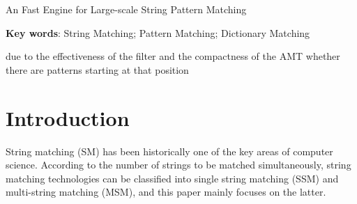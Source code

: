 \documentclass{article}
\begin{document}



\begin{center}
{\Large An Fast Engine for Large-scale String Pattern Matching}
\end{center}


\begin{abstract} 
  Multi-string matching is the core technique that is widely used in
  many applications. In general, it searches a text string for all
  occurrences of some string patterns. However, as the number of
  string patterns increases, most of the existing algorithms suffer
  from two issues: the long matching time, and the high memory
  consumption. To address these issues, in this paper, a fast matching
  engine is proposed for large-scale string matching problems. Our
  engine includes a filter module and a verification module. The filter
  module is based on several bitmaps, which is response for quickly
  filtering out the invalid positions in the text, while for each
  potential matched position, the verification module confirms true
  pattern occurrence. In particular, we design a compact data
  structure called Adaptive Matching Tree (AMT) as the verification
  module, in which each tree node saves some pattern fragments of the
  whole pattern set. The key point is that, the inner structure of
  each tree node is chosen adaptively according to the features of the
  corresponding pattern fragments, and this makes the whole AMT both
  time and space efficient for verifying. The experiments indicate
  that, our matching engine performs better than the prior algorithms,
  especially for large pattern sets.
\end{abstract}

{\textbf{Key words}: String Matching; Pattern Matching; Dictionary Matching}

due to the effectiveness of the filter and the compactness of the AMT
whether there are patterns starting at that position

\section{Introduction}
\label{sec:introduction}

String matching (SM) has been historically one of the key areas of
computer science. According to the number of strings to be matched
simultaneously, string matching technologies can be classified into
single string matching (SSM) and multi-string matching (MSM), and this
paper mainly focuses on the latter.
\end{document}
